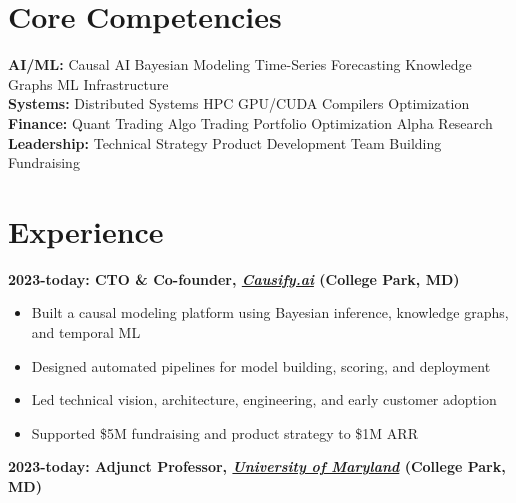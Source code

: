 \documentclass[10pt, letterpaper]{article}
\providecommand{\tightlist}{%
\setlength{\itemsep}{0pt}
\setlength{\parskip}{0pt}}
\begin{document}
  \section{\texorpdfstring{\textbf{Core Competencies}}{Core Competencies}}
  \label{core-competencies}

  \textbf{AI/ML:} Causal AI \textbar{} Bayesian Modeling \textbar{} Time-Series
  Forecasting \textbar{} Knowledge Graphs \textbar{} ML Infrastructure \\
  \textbf{Systems:} Distributed Systems \textbar{} HPC \textbar{} GPU/CUDA
  \textbar{} Compilers \textbar{} Optimization \\ \textbf{Finance:} Quant
  Trading \textbar{} Algo Trading \textbar{} Portfolio Optimization \textbar{}
  Alpha Research \\ \textbf{Leadership:} Technical Strategy \textbar{}
  Product Development \textbar{} Team Building \textbar{} Fundraising

  \section{\texorpdfstring{\textbf{Experience}}{Experience}}
  \label{experience}

  \textbf{2023-today: CTO \& Co-founder,
  \href{http://Causify.ai}{\emph{Causify.ai}} (College Park, MD)}

  \begin{itemize}
    \tightlist

    \item Built a causal modeling platform using Bayesian inference,
      knowledge graphs, and temporal ML

    \item Designed automated pipelines for model building, scoring, and deployment

    \item Led technical vision, architecture, engineering, and early
      customer adoption

    \item Supported \$5M fundraising and product strategy to \$1M ARR
  \end{itemize}

  \textbf{2023-today: Adjunct Professor,
  \href{https://cmns.umd.edu/people/giacinto-paolo-saggese}{\emph{University
  of Maryland}}
  (College Park, MD)}
\end{document}
